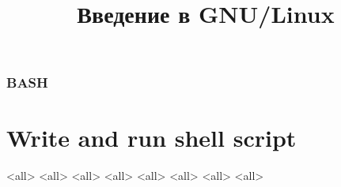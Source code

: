 
\title{Введение в GNU/Linux}




\begin{frame}
	\frametitle{BASH}
	\titlepage
	\vspace{-0.5cm}
	\begin{center}
	\end{center}
\end{frame}

\begin{frame}
	\tableofcontents
\end{frame}





\section{Write and run shell script}
\mode<all>{}
\mode<all>{}
\mode<all>{}
\mode<all>{}
\mode<all>{}
\mode<all>{}
\mode<all>{}
\mode<all>{}



